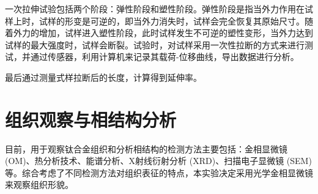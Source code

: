 一次拉伸试验包括两个阶段：弹性阶段和塑性阶段。弹性阶段是指当外力作用在试样上时，试样的形变是可逆的，即当外力消失时，试样会完全恢复其原始尺寸。随着外力的增加，试样进入塑性阶段，此时试样发生不可逆的塑性变形，当外力达到试样的最大强度时，试样会断裂。试验时，对试样采用一次性拉断的方式来进行测试，并通过传感器，利用计算机来记录其载荷-位移曲线，导出数据进行分析。

最后通过测量式样拉断后的长度，计算得到延伸率。

\section{组织观察与相结构分析}
目前，用于观察钛合金组织和分析相结构的检测方法主要包括：金相显微镜 (OM)、热分析技术、能谱分析、X射线衍射分析 (XRD)、扫描电子显微镜 (SEM)等。综合考虑了不同检测方法对组织表征的特点，本实验决定采用光学金相显微镜 来观察组织形貌。

